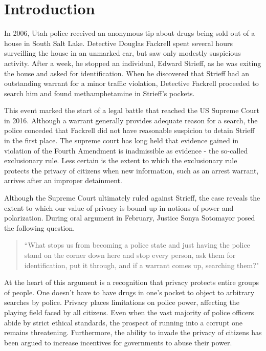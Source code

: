 %

\section{Introduction}
\label{sec:intro}




In 2006, Utah police received an anonymous tip about drugs being sold out of a house in South Salt Lake. Detective Douglas Fackrell spent several hours surveilling the house in an unmarked car, but saw only modestly suspicious activity.  After a week, he stopped an individual, Edward Strieff, as he was exiting the house and asked for identification.  When he discovered that Strieff had an outstanding warrant for a minor traffic violation, Detective Fackrell proceeded to search him and found methamphetamine in Strieff's pockets.  

This event marked the start of a legal battle that reached the US Supreme Court in 2016.  Although a warrant generally provides adequate reason for a search, the police conceded that Fackrell did not have reasonable suspicion to detain Strieff in the first place.  The supreme court has long held that evidence gained in violation of the Fourth Amendment is inadmissible as evidence - the so-called exclusionary rule.  Less certain is the extent to which the exclusionary rule protects the privacy of citizens when new information, such as an arrest warrant, arrives after an improper detainment.

Although the Supreme Court ultimately ruled against Strieff, the case reveals the extent to which our value of privacy is bound up in notions of power and polarization.  During oral argument in February, Justice Sonya Sotomayor posed the following question. 

\begin{quote}``What stops us from becoming a police state and just having the police stand on the corner down here and stop every person, ask them for identification, put it through, and if a warrant comes up, searching them?"
\end{quote}

At the heart of this argument is a recognition that privacy protects entire groups of people.  One doesn't have to have drugs in one's pocket to object to arbitrary searches by police.  Privacy places limitations on police power, affecting the playing field faced by all citizens.  Even when the vast majority of police officers abide by strict ethical standards, the prospect of running into a corrupt one remains threatening.  Furthermore, the ability to invade the privacy of citizens has been argued to increase incentives for governments to abuse their power.~\cite{laskowskigovernment}

